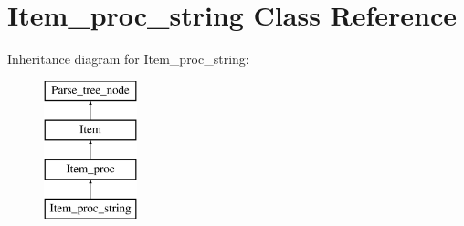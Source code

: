 \hypertarget{classItem__proc__string}{}\section{Item\+\_\+proc\+\_\+string Class Reference}
\label{classItem__proc__string}
Inheritance diagram for Item\+\_\+proc\+\_\+string\+:\begin{figure}[H]
\begin{center}
\leavevmode
\includegraphics[height=4.000000cm]{classItem__proc__string}
\end{center}
\end{figure}
